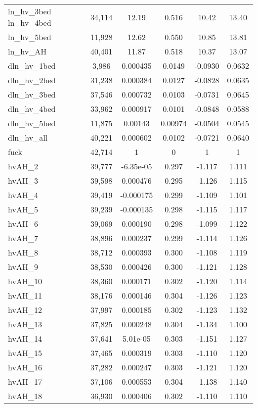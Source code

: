 \begin{tabular}{lccccc}
ln\_hv\_3bed 
ln\_hv\_4bed & 34,114 & 12.19 & 0.516 & 10.42 & 13.40 \\
ln\_hv\_5bed & 11,928 & 12.62 & 0.550 & 10.85 & 13.81 \\
ln\_hv\_AH & 40,401 & 11.87 & 0.518 & 10.37 & 13.07 \\
dln\_hv\_1bed & 3,986 & 0.000435 & 0.0149 & -0.0930 & 0.0632 \\
dln\_hv\_2bed & 31,238 & 0.000384 & 0.0127 & -0.0828 & 0.0635 \\
dln\_hv\_3bed & 37,546 & 0.000732 & 0.0103 & -0.0731 & 0.0645 \\
dln\_hv\_4bed & 33,962 & 0.000917 & 0.0101 & -0.0848 & 0.0588 \\
dln\_hv\_5bed & 11,875 & 0.00143 & 0.00974 & -0.0504 & 0.0545 \\
dln\_hv\_all & 40,221 & 0.000602 & 0.0102 & -0.0721 & 0.0640 \\
fuck & 42,714 & 1 & 0 & 1 & 1 \\
hvAH\_2 & 39,777 & -6.35e-05 & 0.297 & -1.117 & 1.111 \\
hvAH\_3 & 39,598 & 0.000476 & 0.295 & -1.126 & 1.115 \\
hvAH\_4 & 39,419 & -0.000175 & 0.299 & -1.109 & 1.101 \\
hvAH\_5 & 39,239 & -0.000135 & 0.298 & -1.115 & 1.117 \\
hvAH\_6 & 39,069 & 0.000190 & 0.298 & -1.099 & 1.122 \\
hvAH\_7 & 38,896 & 0.000237 & 0.299 & -1.114 & 1.126 \\
hvAH\_8 & 38,712 & 0.000393 & 0.300 & -1.108 & 1.119 \\
hvAH\_9 & 38,530 & 0.000426 & 0.300 & -1.121 & 1.128 \\
hvAH\_10 & 38,360 & 0.000171 & 0.302 & -1.120 & 1.114 \\
hvAH\_11 & 38,176 & 0.000146 & 0.304 & -1.126 & 1.123 \\
hvAH\_12 & 37,997 & 0.000185 & 0.302 & -1.123 & 1.132 \\
hvAH\_13 & 37,825 & 0.000248 & 0.304 & -1.134 & 1.100 \\
hvAH\_14 & 37,641 & 5.01e-05 & 0.303 & -1.151 & 1.127 \\
hvAH\_15 & 37,465 & 0.000319 & 0.303 & -1.110 & 1.120 \\
hvAH\_16 & 37,282 & 0.000247 & 0.303 & -1.121 & 1.120 \\
hvAH\_17 & 37,106 & 0.000553 & 0.304 & -1.138 & 1.140 \\
hvAH\_18 & 36,930 & 0.000406 & 0.302 & -1.110 & 1.110 \\

\end{tabular}
